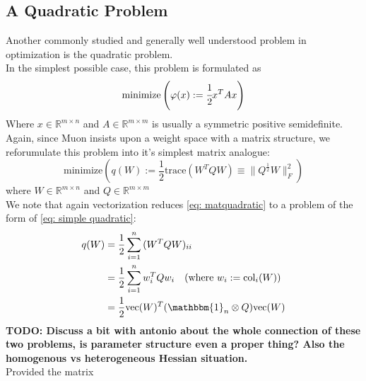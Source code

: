 \documentclass[12pt]{book}
\newcommand{\R}{\mathbb{R}}
\newcommand{\todo}[1]{{\color{red}\bf{TODO: #1}}}
\begin{document}
\subsection{A Quadratic Problem}
Another commonly studied and generally well understood problem in optimization is the quadratic problem. \\
In the simplest possible case, this problem is formulated as 
\begin{equation}\label{eq: simple quadratic}
	\text{minimize} \left( \varphi(x) := \cfrac{1}{2} x^{T} A x\right) 
\end{equation}
Where $x \in \R^{m\times n}$ and $A\in \R^{m\times m}$ is usually a symmetric positive semidefinite.
\\
Again, since Muon insists upon a weight space with a matrix structure, we reforumulate this problem into it's simplest matrix analogue:
\begin{equation}\label{eq: matquadratic}
	\text{minimize}\left( q(W) := \frac{1}{2} \text{trace}(W^{T} Q W)  \equiv \|Q^{\frac{1}{2}} W\|_F^2\right)
\end{equation}
where $W\in\R^{m\times n}$ and $Q\in\R^{m\times m}$\\
We note that again vectorization reduces \eqref{eq: matquadratic} to a problem of the form of \eqref{eq: simple quadratic}:
\begin{align*}
q(W) &= \frac{1}{2} \sum_{i=1}^{n} {(W^{T} Q W)_{ii}} \\
     &= \frac{1}{2} \sum_{i=1}^{n} {w_i^{T} Q w_i}    \quad (\text{where } w_i := \text{col}_i(W))\\
 &= \frac{1}{2} \text{vec}(W)^{T} (\mathbbm{1}_n \otimes Q) \text{vec}(W) 
\end{align*}
\todo{Discuss a bit with antonio about the whole connection of these two problems, is parameter structure even a proper thing? Also the homogenous vs heterogeneous Hessian situation. }
\\
Provided the matrix 
\end{document}
